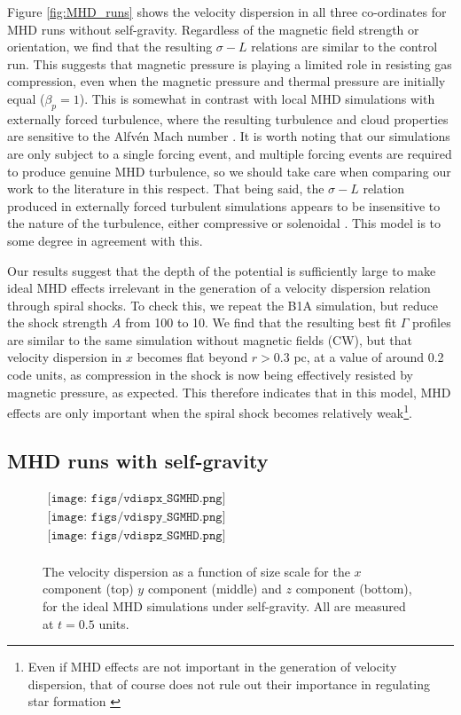 \documentclass[a4paper,fleqn,usenatbib]{mnras}
\begin{document}
\noindent Figure \ref{fig:MHD_runs} shows the velocity dispersion in all three co-ordinates for MHD runs without self-gravity.  Regardless of the magnetic field strength or orientation, we find that the resulting $\sigma-L$ relations are similar to the control run.  This suggests that magnetic pressure is playing a limited role in resisting gas compression, even when the magnetic pressure and thermal pressure are initially equal ($\beta_p=1$).  This is somewhat in contrast with local MHD simulations with externally forced turbulence, where the resulting turbulence and cloud properties are sensitive to the Alfv\'{e}n Mach number \citep{Padoan1999}.  It is worth noting that our simulations are only subject to a single forcing event, and multiple forcing events are required to produce genuine MHD turbulence, so we should take care when comparing our work to the literature in this respect.  That being said, the $\sigma-L$ relation produced in externally forced turbulent simulations appears to be insensitive to the nature of the turbulence, either compressive or solenoidal \citep{Kritsuk2007,Federrath2010}.  This model is to some degree in agreement with this. 

Our results suggest that the depth of the potential is sufficiently large to make ideal MHD effects irrelevant in the generation of a velocity dispersion relation through spiral shocks.  To check this, we repeat the B1A simulation, but reduce the shock strength $A$ from 100 to 10.  We find that the resulting best fit $\Gamma$ profiles are similar to the same simulation without magnetic fields (CW), but that velocity dispersion in $x$ becomes flat beyond $r>0.3$ pc, at a value of around 0.2 code units, as compression in the shock is now being effectively resisted by magnetic pressure, as expected.  This therefore indicates that in this model, MHD effects are only important when the spiral shock becomes relatively weak\footnote{Even if MHD effects are not important in the generation of velocity dispersion, that of course does not rule out their importance in regulating star formation \citep[cf][]{Padoan2011,Federrath2016}}.

\subsection{MHD runs with self-gravity}

\begin{figure*}
\begin{center}
$\begin{array}{c}
\texttt{[image: figs/vdispx\_SGMHD.png]} \\
\texttt{[image: figs/vdispy\_SGMHD.png]} \\
\texttt{[image: figs/vdispz\_SGMHD.png]} \\
\end{array}$
\end{center}
\caption{The velocity dispersion as a function of size scale for the $x$ component (top) $y$ component (middle) and $z$ component (bottom), for the ideal MHD simulations under self-gravity.  All are measured at $t=0.5$ units.}
\label{fig:SGMHD_runs}
\end{figure*}
\end{document}
